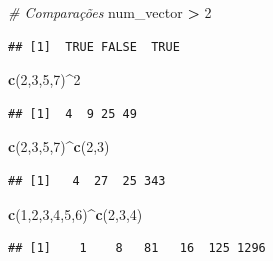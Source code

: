 \documentclass[
]{book}
\newenvironment{Shaded}{\begin{snugshade}}{\end{snugshade}}
\newcommand{\CommentTok}[1]{\textcolor[rgb]{0.56,0.35,0.01}{\textit{#1}}}
\newcommand{\DecValTok}[1]{\textcolor[rgb]{0.00,0.00,0.81}{#1}}
\newcommand{\FunctionTok}[1]{\textcolor[rgb]{0.13,0.29,0.53}{\textbf{#1}}}
\newcommand{\NormalTok}[1]{#1}
\newcommand{\SpecialCharTok}[1]{\textcolor[rgb]{0.81,0.36,0.00}{\textbf{#1}}}
\begin{document}
\begin{Shaded}
\begin{Highlighting}[]
\CommentTok{\# Comparações}
\NormalTok{num\_vector }\SpecialCharTok{\textgreater{}} \DecValTok{2}  
\end{Highlighting}
\end{Shaded}

\begin{verbatim}
## [1]  TRUE FALSE  TRUE
\end{verbatim}

\begin{Shaded}
\begin{Highlighting}[]
\FunctionTok{c}\NormalTok{(}\DecValTok{2}\NormalTok{,}\DecValTok{3}\NormalTok{,}\DecValTok{5}\NormalTok{,}\DecValTok{7}\NormalTok{)}\SpecialCharTok{\^{}}\DecValTok{2}
\end{Highlighting}
\end{Shaded}

\begin{verbatim}
## [1]  4  9 25 49
\end{verbatim}

\begin{Shaded}
\begin{Highlighting}[]
\FunctionTok{c}\NormalTok{(}\DecValTok{2}\NormalTok{,}\DecValTok{3}\NormalTok{,}\DecValTok{5}\NormalTok{,}\DecValTok{7}\NormalTok{)}\SpecialCharTok{\^{}}\FunctionTok{c}\NormalTok{(}\DecValTok{2}\NormalTok{,}\DecValTok{3}\NormalTok{)}
\end{Highlighting}
\end{Shaded}

\begin{verbatim}
## [1]   4  27  25 343
\end{verbatim}

\begin{Shaded}
\begin{Highlighting}[]
\FunctionTok{c}\NormalTok{(}\DecValTok{1}\NormalTok{,}\DecValTok{2}\NormalTok{,}\DecValTok{3}\NormalTok{,}\DecValTok{4}\NormalTok{,}\DecValTok{5}\NormalTok{,}\DecValTok{6}\NormalTok{)}\SpecialCharTok{\^{}}\FunctionTok{c}\NormalTok{(}\DecValTok{2}\NormalTok{,}\DecValTok{3}\NormalTok{,}\DecValTok{4}\NormalTok{)}
\end{Highlighting}
\end{Shaded}

\begin{verbatim}
## [1]    1    8   81   16  125 1296
\end{verbatim}
\end{document}
